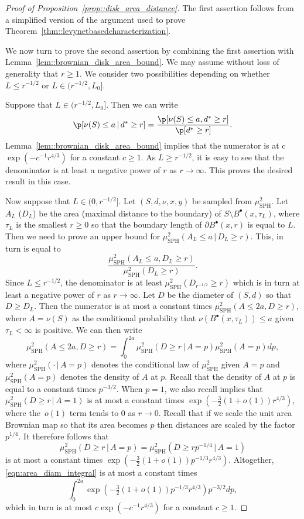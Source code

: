\documentclass[JEP,XML,SOM,Unicode]{cedram}
\newcommand{\sbullet}{{\scriptscriptstyle\bullet}}
\theoremstyle{plain}
\numberwithin{theorem}{section}
\theoremstyle{definition}
\newcommand{\mustwo}{\mu_{\mathrm{SPH}}^2}
\newcommand{\giv}{\,|\,}
\newcommand{\fb}[2]{B^\sbullet(#1,#2)}
\begin{document}
\begin{proof}[Proof of Proposition~\ref{prop::disk_area_distance}]
The first assertion follows from a simplified version of the argument used to prove Theorem~\ref{thm::levynetbasedcharacterization}.

We now turn to prove the second assertion by combining the first assertion with Lemma~\ref{lem::brownian_disk_area_bound}. We may assume without loss of generality that $r \geq 1$. We consider two possibilities depending on whether $L \leq r^{-1/2}$ or $L \in (r^{-1/2}, L_0]$.

Suppose that $L \in (r^{-1/2},L_0]$. Then we can write
\[
\p[ \nu(S) \leq a \giv d^* \geq r] = \frac{\p[ \nu(S) \leq a, d^* \geq r]}{\p[d^* \geq r]}.
\]
Lemma~\ref{lem::brownian_disk_area_bound} implies that the numerator is at c $\exp(-c^{-1} r^{4/3})$ for a constant $c \geq 1$. As $L \geq r^{-1/2}$, it is easy to see that the denominator is at least a negative power of $r$ as $r \to \infty$. This proves the desired result in this case.

Now suppose that $L \in (0,r^{-1/2}]$. Let $(S,d,\nu,x,y)$ be sampled from $\mustwo$. Let $A_L$ (\resp $D_L$) be the area (\resp maximal distance to the boundary) of $S \setminus \fb{x}{\tau_L}$, where $\tau_L$ is the smallest $r \geq 0$ so that the boundary length of $\partial \fb{x}{r}$ is equal to $L$. Then we need to prove an upper bound for $\mustwo(A_L \leq a \giv D_L \geq r)$. This, in turn is equal to
\[
\frac{\mustwo(A_L \leq a, D_L \geq r)}{\mustwo(D_L \geq r)}.
\]
Since $L \leq r^{-1/2}$, the denominator is at least $\mustwo(D_{r^{-1/2}} \geq r)$ which is in turn at least a negative power of $r$ as $r \to \infty$. Let $D$ be the diameter of $(S,d)$ so that $D \geq D_L$. Then the numerator is at most a constant times $\mustwo(A \leq 2a, D \geq r)$, where $A = \nu(S)$ as the conditional probability that $\nu(\fb{x}{\tau_L}) \leq a$ given $\tau_L < \infty$ is positive. We can then write
\begin{equation}
\label{eqn:area_diam_integral}	
\mustwo(A \leq 2a, D \geq r) = \int_0^{2a} \mustwo(D \geq r \giv A = p) \mustwo(A = p) dp,
\end{equation}
where $\mustwo( \cdot \giv A\!=\!p)$ denotes the conditional law of $\mustwo$ given $A\!=\!p$ and \hbox{$\mustwo(A\!=\!p)$} denotes the density of $A$ at $p$. Recall that the density of $A$ at $p$ is equal to a constant times $p^{-3/2}$. When $p=1$, we also recall \cite[Prop.\,14]{serlet_ldp} implies that \hbox{$\mustwo(D \geq r \giv A = 1)$} is at most a constant times $\exp(-\tfrac{3}{2}(1+o(1)) r^{4/3})$, where the~$o(1)$ term tends to $0$ as $r \to 0$. Recall that if we scale the unit area Brownian map so that its area becomes $p$ then distances are scaled by the factor $p^{1/4}$. It therefore follows that
\[
\mustwo(D \geq r \giv A = p) = \mustwo(D \geq r p^{-1/4} \giv A = 1)
\]
is at most a constant times $\exp(-\tfrac{3}{2}(1+o(1)) p^{-1/3} r^{4/3})$. Altogether, \eqref{eqn:area_diam_integral} is at most a constant times
\[
\int_0^{2a} \exp(-\tfrac{3}{2}(1+o(1)) p^{-1/3} r^{4/3}) p^{-3/2} dp,
\]
which in turn is at most $c \exp(-c^{-1} r^{4/3})$ for a constant $c \geq 1$.
\end{proof}
\end{document}
